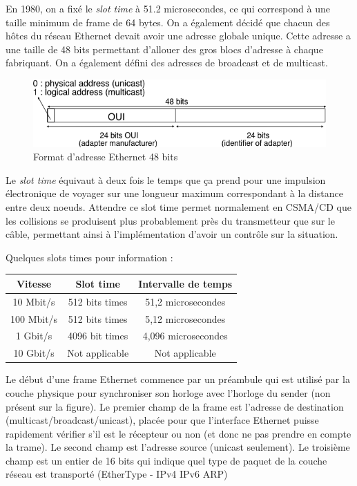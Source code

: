    En 1980, on a fixé le \textit{slot time} à 51.2 microsecondes, ce qui correspond à une taille minimum de frame de 64 bytes. On a également décidé que chacun des hôtes du réseau Ethernet devait avoir une adresse globale unique. Cette adresse a une taille de 48 bits permettant d'allouer des gros blocs d'adresse à chaque fabriquant. On a également défini des adresses de broadcast et de multicast.
    
    \begin{figure}[!ht]
	\begin{center}
	  \includegraphics[scale=0.5]{ethernet_address_format.png}
	  \caption{Format d'adresse Ethernet 48 bits}
	\end{center}
    \end{figure}

    
    Le \textit{slot time} équivaut à deux fois le temps que ça prend pour une impulsion électronique de voyager sur une longueur maximum correspondant à la distance entre deux noeuds. Attendre ce slot time permet normalement en CSMA/CD que les collisions se produisent plus probablement près du transmetteur que sur le câble, permettant ainsi à l'implémentation d'avoir un contrôle sur la situation.
    
    Quelques slots times pour information :
    
    \begin{center}
      \begin{tabular}{c|c|c}
	Vitesse & Slot time & Intervalle de temps \\
	\hline
	10 Mbit/s & 512 bits times & 51,2 microsecondes \\
	100 Mbit/s & 512 bits times & 5,12 microsecondes \\
	1 Gbit/s & 4096 bit times & 4,096 microsecondes \\
	10 Gbit/s & Not applicable & Not applicable \\
      \end{tabular}
    \end{center}
    
    Le début d'une frame Ethernet commence par un préambule qui est utilisé par la couche physique pour synchroniser son horloge avec l'horloge du sender (non présent sur la figure). Le premier champ de la frame est l'adresse de destination (multicast/broadcast/unicast), placée pour que l'interface Ethernet puisse rapidement vérifier s'il est le récepteur ou non (et donc ne pas prendre en compte la trame). Le second champ est l'adresse source (unicast seulement). Le troisième champ est un entier de 16 bits qui indique quel type de paquet de la couche réseau est transporté (EtherType - IPv4 IPv6 ARP)
    
